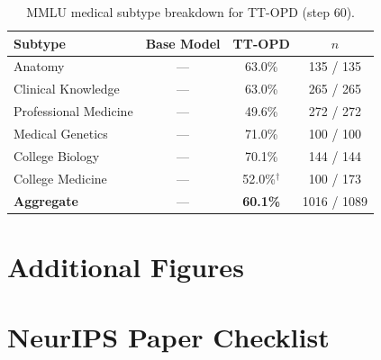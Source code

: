 \documentclass{article}
\begin{document}
\begin{table}[h]
\centering
\caption{MMLU medical subtype breakdown for TT-OPD (step 60).}
\label{tab:mmlu_subtypes}
\small
\begin{tabular}{lccc}
\toprule
\textbf{Subtype} & \textbf{Base Model} & \textbf{TT-OPD} & \textbf{$n$} \\
\midrule
Anatomy & --- & 63.0\% & 135 / 135 \\
Clinical Knowledge & --- & 63.0\% & 265 / 265 \\
Professional Medicine & --- & 49.6\% & 272 / 272 \\
Medical Genetics & --- & 71.0\% & 100 / 100 \\
College Biology & --- & 70.1\% & 144 / 144 \\
College Medicine & --- & 52.0\%$^\dagger$ & 100 / 173 \\
\midrule
\textbf{Aggregate} & --- & \textbf{60.1\%} & 1016 / 1089 \\
\bottomrule
\end{tabular}
\end{table}


\section{Additional Figures}
\label{app:additional_figures}




\newpage
\section*{NeurIPS Paper Checklist}
\end{document}
